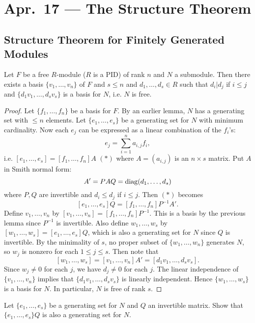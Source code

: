 \chapter{Apr.~17 --- The Structure Theorem}

\section{Structure Theorem for Finitely Generated Modules}
\begin{theorem}
  Let $F$ be a free $R$-module ($R$ is a PID) of rank
  $n$ and
  $N$ a submodule. Then there exists a basis
  $\{v_1, \dots, v_n\}$ of $F$ and $s \le n$ and
  $d_1, \dots, d_s \in R$ such that $d_i | d_j$ if
  $i \le j$ and $\{d_1 v_1, \dots, d_s v_s\}$ is a
  basis for $N$, i.e. $N$ is free.
\end{theorem}

\begin{proof}
  Let $\{f_1, \dots, f_n\}$ be a basis for $F$. By
  an earlier lemma, $N$ has a generating set with
  $\le n$ elements. Let $\{e_1, \dots, e_s\}$ be a
  generating set for $N$ with minimum cardinality.
  Now each $e_j$ can be expressed as a linear combination
  of the $f_i$'s:
  \[
    e_j = \sum_{i = 1}^n a_{i, j} f_i,
  \]
  i.e. $[e_1, \dots, e_s] = [f_1, \dots, f_n] A$ $(*)$
  where
  $A = (a_{i, j})$ is an $n \times s$ matrix.
  Put $A$ in Smith normal form:
  \[
    A' = PAQ = \operatorname{diag}(d_1, \dots, d_s)
  \]
  where $P, Q$ are invertible and $d_i \le d_j$ if
  $i \le j$. Then $(*)$ becomes
  \[
    [e_1, \dots, e_s]Q = [f_1, \dots, f_n] P^{-1} A'.
  \]
  Define $v_1, \dots, v_n$ by $[v_1, \dots, v_n] = [f_1, \dots, f_n] P^{-1}$.
  This is a basis by the previous lemma since
  $P^{-1}$ is invertible. Also define
  $w_1, \dots, w_s$ by $[w_1, \dots, w_s] = [e_1, \dots, e_s]Q$,
  which is also a generating set for $N$ since $Q$ is
  invertible. By the minimality of $s$, no proper
  subset of $\{w_1, \dots, w_n\}$ generates $N$, so
  $w_j$ is nonzero for each $1 \le j \le s$. Then note
  that
  \[
    [w_1, \dots, w_s] = [v_1, \dots, v_n] A'
    = [d_1 v_1, \dots, d_s v_s].
  \]
  Since $w_j \ne 0$ for each $j$, we have $d_j \ne 0$
  for each $j$. The linear independence of
  $\{v_1, \dots, v_n\}$ implies that $\{d_1 v_1, \dots, d_s v_s\}$
  is linearly independent. Hence $\{w_1, \dots, w_s\}$
  is a basis for $N$. In particular, $N$ is free of
  rank $s$.
\end{proof}

\begin{exercise}
  Let $\{e_1, \dots, e_s\}$ be a generating set
  for $N$ and $Q$ an invertible matrix. Show that
  $\{e_1, \dots, e_s\}Q$ is also a generating set
  for $N$.
\end{exercise}

